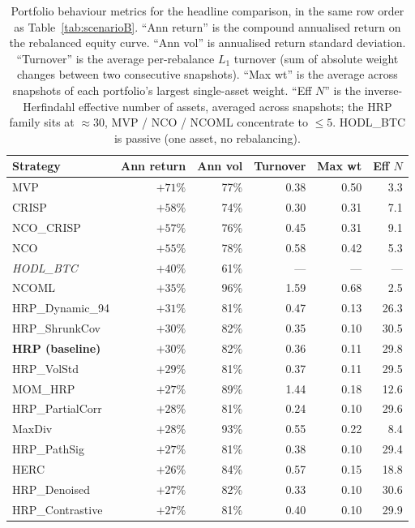 \documentclass[11pt,a4paper]{article}
\begin{document}
\begin{table}[H]
\centering\small
\caption{Portfolio behaviour metrics for the headline comparison, in
the same row order as Table~\ref{tab:scenarioB}. ``Ann return'' is the
compound annualised return on the rebalanced equity curve. ``Ann vol''
is annualised return standard deviation. ``Turnover'' is the average
per-rebalance $L_1$ turnover (sum of absolute weight changes between
two consecutive snapshots). ``Max wt'' is the average across snapshots
of each portfolio's largest single-asset weight. ``Eff $N$'' is the
inverse-Herfindahl effective number of assets, averaged across
snapshots; the HRP family sits at $\approx 30$, MVP / NCO / NCOML
concentrate to $\le 5$. HODL\_BTC is passive (one asset, no
rebalancing).}
\label{tab:behaviour}
\begin{tabular}{lrrrrr}
\toprule
Strategy & Ann return & Ann vol & Turnover & Max wt & Eff $N$ \\
\midrule
MVP                & $+71\%$ & 77\% & 0.38 & 0.50 & 3.3 \\
CRISP              & $+58\%$ & 74\% & 0.30 & 0.31 & 7.1 \\
NCO\_CRISP         & $+57\%$ & 76\% & 0.45 & 0.31 & 9.1 \\
NCO                & $+55\%$ & 78\% & 0.58 & 0.42 & 5.3 \\
\textit{HODL\_BTC} & $+40\%$ & 61\% & --- & --- & --- \\
NCOML              & $+35\%$ & 96\% & 1.59 & 0.68 & 2.5 \\
HRP\_Dynamic\_94   & $+31\%$ & 81\% & 0.47 & 0.13 & 26.3 \\
HRP\_ShrunkCov     & $+30\%$ & 82\% & 0.35 & 0.10 & 30.5 \\
\textbf{HRP (baseline)} & $+30\%$ & 82\% & 0.36 & 0.11 & 29.8 \\
HRP\_VolStd        & $+29\%$ & 81\% & 0.37 & 0.11 & 29.5 \\
MOM\_HRP           & $+27\%$ & 89\% & 1.44 & 0.18 & 12.6 \\
HRP\_PartialCorr   & $+28\%$ & 81\% & 0.24 & 0.10 & 29.6 \\
MaxDiv             & $+28\%$ & 93\% & 0.55 & 0.22 & 8.4 \\
HRP\_PathSig       & $+27\%$ & 81\% & 0.38 & 0.10 & 29.4 \\
HERC               & $+26\%$ & 84\% & 0.57 & 0.15 & 18.8 \\
HRP\_Denoised      & $+27\%$ & 82\% & 0.33 & 0.10 & 30.6 \\
HRP\_Contrastive   & $+27\%$ & 81\% & 0.40 & 0.10 & 29.9 \\

\end{tabular}
\end{table}
\end{document}
